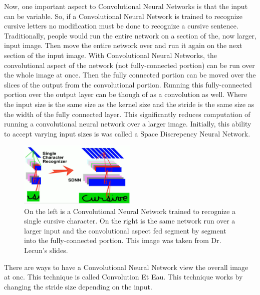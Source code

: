 \documentclass{article}
\begin{document}
\noindent Now, one important aspect to Convolutional Neural Networks is that the input can be variable. 
So, if a Convolutional Neural Network is trained to recognize cursive letters no modification must be done to recognize a cursive sentence.
Traditionally, people would run the entire network on a section of the, now larger, input image.
Then move the entire network over and run it again on the next section of the input image.
With Convolutional Neural Networks, the convolutional aspect of the network (not fully-connected portion) can be run over the whole image at once.
Then the fully connected portion can be moved over the slices of the output from the convolutional portion.
Running this fully-connected portion over the output layer can be though of as a convolution as well.
Where the input size is the same size as the kernel size and the stride is the same size as the width of the fully connected layer.
This significantly reduces computation of running a convolutional neural network over a larger image.
Initially, this ability to accept varying input sizes is was called a Space Discrepency Neural Network.

\vspace{3mm}

\begin{figure}[ht!]
  \centering
      \includegraphics[width=0.5\textwidth]{SDNN.png}
          \caption{
            On the left is a Convolutional Neural Network trained to recognize a single cursive character.
            On the right is the same network run over a larger input and the convolutional aspect fed segment by segment into the fully-connected portion.
            This image was taken from Dr. Lecun's slides.
          }
\end{figure}

\noindent There are ways to have a Convolutional Neural Network view the overall image at onc.
This technique is called 
Convolution Et Eau.
This technique works by changing the stride size depending on the input.
\end{document}
